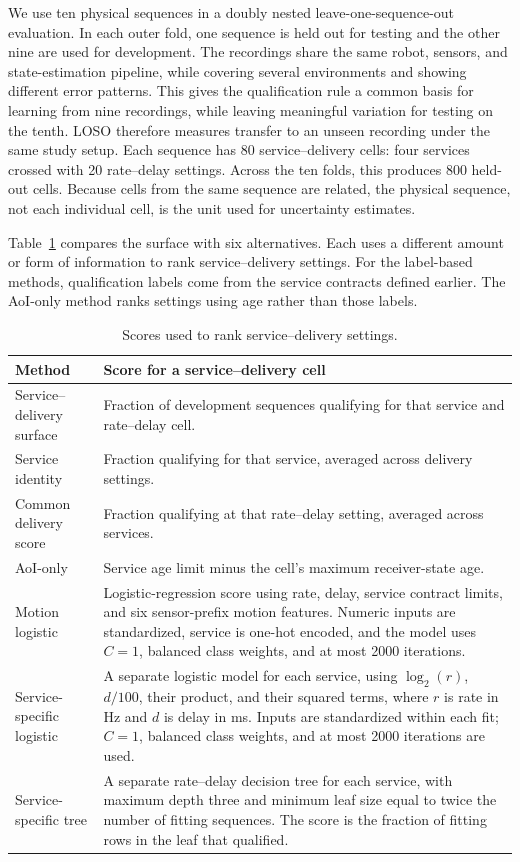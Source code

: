 \documentclass[journal]{IEEEtran}
\begin{document}
We use ten physical sequences in a doubly nested leave-one-sequence-out
evaluation. In each outer fold, one sequence is held out for testing and
the other nine are used for development. The
recordings share the same robot, sensors, and state-estimation
pipeline, while covering several environments and showing
different error patterns. This gives the qualification rule a
common basis for learning from nine recordings, while leaving
meaningful variation for testing on the tenth. LOSO therefore
measures transfer to an unseen recording under the same study
setup. Each sequence has 80
service--delivery cells: four services crossed with 20 rate--delay
settings. Across the ten folds, this produces 800 held-out cells.
Because cells from the same sequence are related, the physical sequence,
not each individual cell, is the unit used for uncertainty estimates.

Table~\ref{tab:exp_comparators} compares the surface with six alternatives. Each uses a different
amount or form of information to rank service--delivery settings. For
the label-based methods, qualification labels come from the service
contracts defined earlier. The AoI-only method ranks settings using age
rather than those labels.

\begin{table}[!tb]
\centering
\caption{Scores used to rank service--delivery settings.}
\label{tab:exp_comparators}
\footnotesize
\begin{tabular}{@{}>{\raggedright\arraybackslash}p{}>{\raggedright\arraybackslash}p{}@{}}
\toprule
Method & Score for a service--delivery cell\\
\midrule
Service--delivery surface &
Fraction of development sequences qualifying for that service and rate--delay cell.\\
Service identity &
Fraction qualifying for that service, averaged across delivery settings.\\
Common delivery score &
Fraction qualifying at that rate--delay setting, averaged across services.\\
AoI-only &
Service age limit minus the cell's maximum receiver-state age.\\
Motion logistic &
Logistic-regression score using rate, delay, service contract limits, and six sensor-prefix motion features. Numeric inputs are standardized, service is one-hot encoded, and the model uses \(C=1\), balanced class weights, and at most 2000 iterations.\\
Service-specific logistic &
A separate logistic model for each service, using $\log_2(r)$, $d/100$, their product, and their squared terms, where $r$ is rate in Hz and $d$ is delay in ms. Inputs are standardized within each fit; \(C=1\), balanced class weights, and at most 2000 iterations are used.\\
Service-specific tree &
A separate rate--delay decision tree for each service, with maximum depth three and minimum leaf size equal to twice the number of fitting sequences. The score is the fraction of fitting rows in the leaf that qualified.\\
\bottomrule
\end{tabular}
\end{table}
\end{document}
